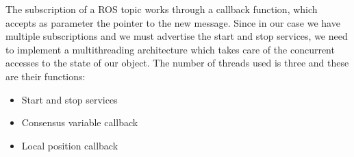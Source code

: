 The subscription of a ROS topic works through a callback function, which accepts as
parameter the pointer to the new message. Since in our case we have multiple subscriptions
and we must advertise the start and stop services, we need to implement a multithreading
architecture which takes care of the concurrent accesses to the state of our object.
The number of threads used is three and these are their functions:
\begin{itemize}
  \item Start and stop services
  \item Consensus variable callback
  \item Local position callback
\end{itemize}







